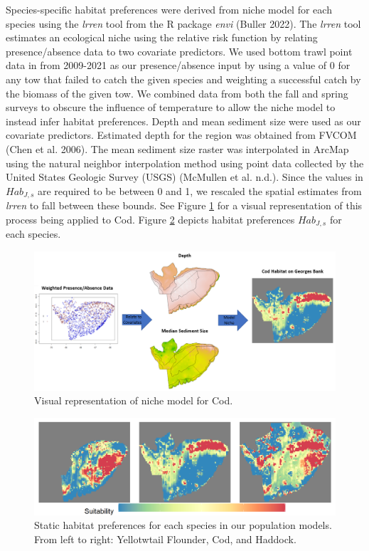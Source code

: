 \documentclass[
  12pt,
]{article}
\begin{document}
Species-specific habitat preferences were derived from niche model for each species using the \emph{lrren} tool from the R package \emph{envi} (Buller 2022). The \emph{lrren} tool estimates an ecological niche using the relative risk function by relating presence/absence data to two covariate predictors. We used bottom trawl point data in from 2009-2021 as our presence/absence input by using a value of 0 for any tow that failed to catch the given species and weighting a successful catch by the biomass of the given tow. We combined data from both the fall and spring surveys to obscure the influence of temperature to allow the niche model to instead infer habitat preferences. Depth and mean sediment size were used as our covariate predictors. Estimated depth for the region was obtained from FVCOM (Chen et al. 2006). The mean sediment size raster was interpolated in ArcMap using the natural neighbor interpolation method using point data collected by the United States Geologic Survey (USGS) (McMullen et al. n.d.). Since the values in \(Hab_{J,s}\) are required to be between 0 and 1, we rescaled the spatial estimates from \emph{lrren} to fall between these bounds. See Figure \ref{fig:hab-plot1} for a visual representation of this process being applied to Cod. Figure \ref{fig:hab-plot} depicts habitat preferences \(Hab_{J,s}\) for each species.

\begin{figure}

{\centering \includegraphics[width=0.95\linewidth]{Images/hab_snip3} 

}

\caption{Visual representation of niche model for Cod.}\label{fig:hab-plot1}
\end{figure}

\begin{figure}

{\centering \includegraphics[width=0.95\linewidth]{Images/Habitat_3species} 

}

\caption{Static habitat preferences for each species in our population models. From left to right: Yellotwtail Flounder, Cod, and Haddock.}\label{fig:hab-plot}
\end{figure}
\end{document}
